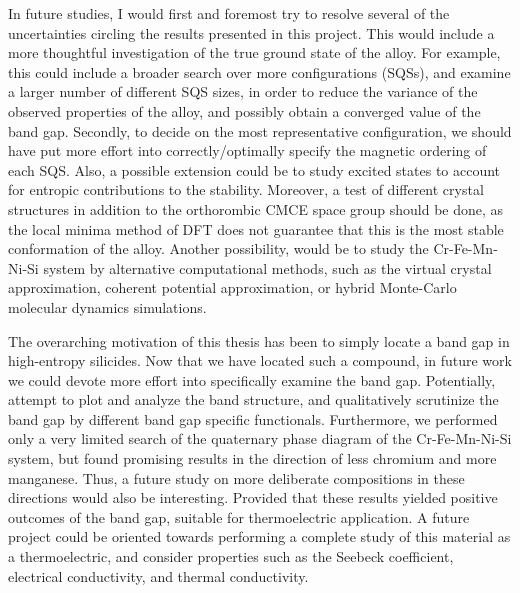 \documentclass[UKenglish]{ifimaster}  %
\begin{document}
In future studies, I would first and foremost try to resolve several of the uncertainties circling the results presented in this project. This would include a more thoughtful investigation of the true ground state of the  alloy. For example, this could include a broader search over more configurations (SQSs), and examine a larger number of different SQS sizes, in order to reduce the variance of the observed properties of the alloy, and possibly obtain a converged value of the band gap. Secondly, to decide on the most representative configuration, we should have put more effort into correctly/optimally specify the magnetic ordering of each SQS. Also, a possible extension could be to study excited states to account for entropic contributions to the stability.  Moreover, a test of different crystal structures in addition to the orthorombic CMCE space group should be done, as the local minima method of DFT does not guarantee that this is the most stable conformation of the alloy. Another possibility, would be to study the Cr-Fe-Mn-Ni-Si system by alternative computational methods, such as the virtual crystal approximation, coherent potential approximation, or hybrid Monte-Carlo molecular dynamics simulations.

The overarching motivation of this thesis has been to simply locate a band gap in high-entropy silicides. Now that we have located such a compound, in future work we could devote more effort into specifically examine the band gap. Potentially, attempt to plot and analyze the band structure, and qualitatively scrutinize the band gap by different band gap specific functionals. Furthermore, we performed only a very limited search of the quaternary phase diagram of the Cr-Fe-Mn-Ni-Si system, but found promising results in the direction of less chromium and more manganese. Thus, a future study on more deliberate compositions in these directions would also be interesting. Provided that these results yielded positive outcomes of the band gap, suitable for thermoelectric application. A future project could be oriented towards performing a complete study of this material as a thermoelectric, and consider properties such as the Seebeck coefficient, electrical conductivity, and thermal conductivity. 

\appendix


\backmatter{}
\printbibliography
\end{document}
